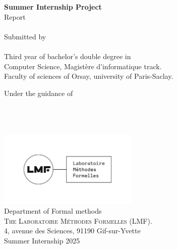 \begin{titlepage}

\begin{center}

\textup{\small {\bf Summer Internship Project} \\ Report}\\[0.3in]

\Large \textbf {}\\[0.7in]


       

\normalsize Submitted by \\[0.2in]
\\
Third year of bachelor's double degree in \\ Computer Science, Magistère d'informatique track.\\
Faculty of sciences of Orsay, university of Paris-Saclay.

\vspace{.2in}
Under the guidance of\\[0.2in]
\\
\\
\\



\vspace{.3in}

\includegraphics[width=0.5\textwidth]{lmf.png}\\[0.1in]
\Large{Department of Formal methods}\\
\normalsize
\textsc{ The Laboratoire Méthodes Formelles (LMF). }\\
4, avenue des Sciences, 91190 Gif-sur-Yvette \\
\vspace{0.2cm}
Summer Internship 2025

\end{center}

\end{titlepage}
